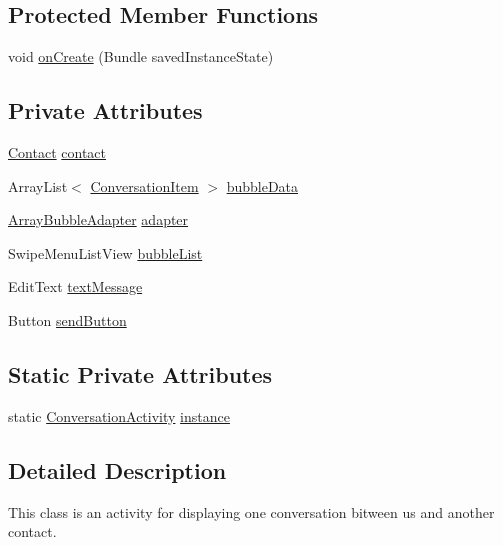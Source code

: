 \subsection*{Protected Member Functions}
\begin{DoxyCompactItemize}
\item 
void \hyperlink{a00007_a85e87cb5ced88dff7c8173ecc4f636d1}{on\+Create} (Bundle saved\+Instance\+State)
\end{DoxyCompactItemize}
\subsection*{Private Attributes}
\begin{DoxyCompactItemize}
\item 
\hyperlink{a00005}{Contact} \hyperlink{a00007_a3459849ab29ad684658dbcd0cf8c5d5a}{contact}
\item 
Array\+List$<$ \hyperlink{a00008}{Conversation\+Item} $>$ \hyperlink{a00007_a68544a0bda28776dfb51718a3c71bf69}{bubble\+Data}
\item 
\hyperlink{a00002}{Array\+Bubble\+Adapter} \hyperlink{a00007_adaad4a865e59995c45ef2ad13f6e88a9}{adapter}
\item 
Swipe\+Menu\+List\+View \hyperlink{a00007_ae5bb074a89738fa417e643960b0041c6}{bubble\+List}
\item 
Edit\+Text \hyperlink{a00007_abc418be8d11246756bfcb7f95123a88d}{text\+Message}
\item 
Button \hyperlink{a00007_a2e4d147a434708e05027f41ecf9ed577}{send\+Button}
\end{DoxyCompactItemize}
\subsection*{Static Private Attributes}
\begin{DoxyCompactItemize}
\item 
static \hyperlink{a00007}{Conversation\+Activity} \hyperlink{a00007_a64a39fb2b7f756356462736dfbdb9f9f}{instance}
\end{DoxyCompactItemize}


\subsection{Detailed Description}
This class is an activity for displaying one conversation bitween us and another contact. 

